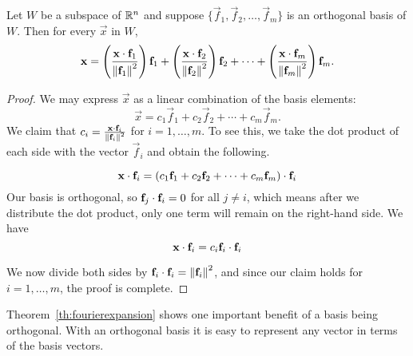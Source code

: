 \documentclass{ximera}
\begin{document}
\begin{theorem}\label{th:fourierexpansion}
Let $W$ be a subspace of $\mathbb{R}^n$ and suppose $\{ \vec{f}_1, \vec{f}_2, \ldots, \vec{f}_m \}$
is an orthogonal basis of $W$.
Then for every $\vec{x}$ in $W$,
\begin{equation}
\mathbf{x} =
\left(\frac{\mathbf{x}\cdot \mathbf{f}_1}{\left\lVert\mathbf{f}_1\right\rVert^2}\right) \mathbf{f}_1 +
\left(\frac{\mathbf{x}\cdot \mathbf{f}_2}{\left\lVert\mathbf{f}_2\right\rVert^2}\right) \mathbf{f}_2 +
\cdots +
\left(\frac{\mathbf{x}\cdot \mathbf{f}_m}{\left\lVert\mathbf{f}_m\right\rVert^2}\right) \mathbf{f}_m.
\end{equation}\label{FourierEqn}
\end{theorem}

\begin{proof}
We may express $\vec{x}$ as a linear combination of the basis elements:
\[ \vec{x} =
c_1 \vec{f}_1 +
c_2 \vec{f}_2 +
\cdots +
c_m \vec{f}_m.
\]
We claim that $c_i = \frac{\mathbf{x}\cdot \mathbf{f}_i}{\left\lVert\mathbf{f}_i\right\rVert^2}$ for $i=1,\ldots,m$. To see this, we take the dot product of
each side with the vector $\vec{f}_i$ and obtain the following.

\begin{equation*}
  \mathbf{x} \cdot \mathbf{f}_i =  \left(c_1\mathbf{f}_1 +
c_2\mathbf{f}_2 +
\cdots +
c_m\mathbf{f}_m\right) \cdot \mathbf{f}_i 
\end{equation*}
Our basis is orthogonal, so $\mathbf{f}_j \cdot \mathbf{f}_i = 0$ for all $j \neq i$, which means after we distribute the dot product, only one term will remain on the right-hand side.  We have 
\begin{equation*}
  \mathbf{x} \cdot \mathbf{f}_i =  c_i\mathbf{f}_i \cdot \mathbf{f}_i 
\end{equation*}

We now divide both sides by $\mathbf{f}_i \cdot \mathbf{f}_i = \left\lVert\mathbf{f}_i\right\rVert^2$, and since our claim holds for $i=1,\ldots,m$, the proof is complete.
\end{proof}

Theorem~\ref{th:fourierexpansion} shows one important benefit of a basis being orthogonal.  With an orthogonal basis it is easy to represent any vector in terms of the basis vectors.  
\end{document}
